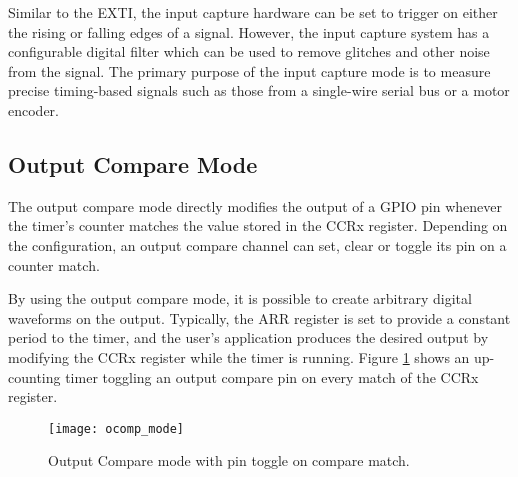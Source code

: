 \documentclass[11pt,fleqn]{book} %
\begin{document}
    Similar to the EXTI, the input capture hardware can be set to trigger on either the rising or falling edges of a signal. However, the input capture system has a configurable digital filter which can be used to remove glitches and other noise from the signal. The primary purpose of the input capture mode is to measure precise timing-based signals such as those from a single-wire serial bus or a motor encoder.  
    
    \subsection{Output Compare Mode}
        The output compare mode directly modifies the output of a GPIO pin whenever the timer's counter matches the value stored in the CCRx register. Depending on the configuration, an output compare channel can set, clear or toggle its pin on a counter match. 
        
        By using the output compare mode, it is possible to create arbitrary digital waveforms on the output. Typically, the ARR register is set to provide a constant period to the timer, and the user's application produces the desired output by modifying the CCRx register while the timer is running. Figure \ref{ocomp_mode} shows an up-counting timer toggling an output compare pin on every match of the CCRx register.  
        
%        
%        
        \begin{figure}[]
            \centering\texttt{[image: ocomp\_mode]}
            \caption{Output Compare mode with pin toggle on compare match.}
            \label{ocomp_mode}
        \end{figure}
    
\end{document}
